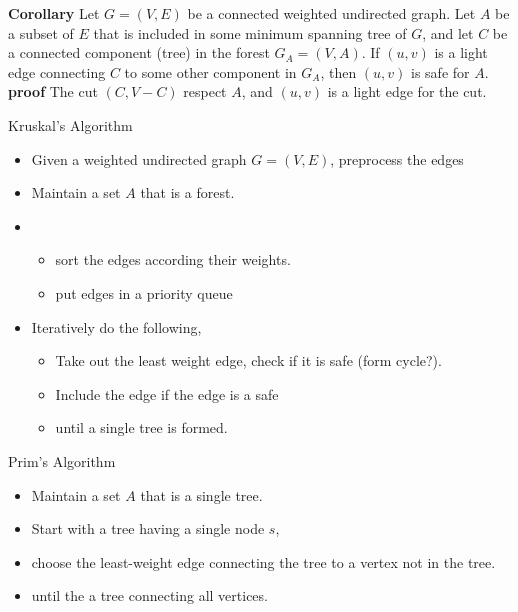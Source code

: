 \documentclass{beamer}
\begin{document}
\begin{frame}{}

{\bf Corollary} Let $G=(V,E)$ be a connected weighted undirected graph.  
 Let $A$ be a subset of $E$ that is included in some minimum spanning
 tree of $G$, and let $C$ be a connected component (tree) in the
 forest $G_A=(V,A)$.  If $(u,v)$ is a light edge connecting $C$ to some 
 other component in $G_A$, then $(u,v)$ is safe for $A$.  \\
{\bf proof} The cut $(C,V-C)$ respect $A$, and $(u,v)$ is a light
edge for the cut.  
\end{frame}

\begin{frame}{}

\centerline {\large Kruskal's Algorithm}
\begin{itemize}
\item Given a weighted undirected graph $G=(V,E)$, preprocess the edges
\item Maintain a set $A$ that is a forest. 
\item
\begin{itemize}
\item sort the edges according their weights.
\item put edges in a priority queue
\end{itemize}
\item Iteratively do the following,
\begin{itemize}
\item Take out the least weight edge, check if it is safe (form cycle?).  
\item Include the edge if the edge is a safe
\item until a single tree is formed. 
\end{itemize}
\end{itemize}
\end{frame}

\begin{frame}{}

\centerline{\large Prim's Algorithm}
\begin{itemize}
\item Maintain a set $A$ that is a single tree. 
\item Start with a tree having a single node $s$, 
\item choose the least-weight  edge connecting the tree to a vertex not in the tree. 
\item until the a tree connecting all vertices. 
\end{itemize}
\end{frame}
\end{document}
